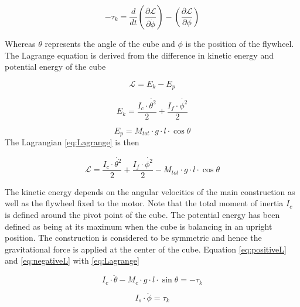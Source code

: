 \documentclass[a4paper,11pt]{kth-mag}
\begin{document}
\begin{equation} \label{eq:negativeL}
-\tau_k=\frac{d}{dt}\left(\frac{\partial \mathcal{L}}{\partial \dot{\phi}}\right)-\left(\frac{\partial \mathcal{L}}{\partial \phi}\right)
\end{equation}

Whereas $\theta$ represents the angle of the cube and $\phi$ is the position of the flywheel. \\
The Lagrange equation is derived from the difference in kinetic energy and potential energy of the cube

\begin{equation} \label{eq:Lagrange}
\mathcal{L} = E_k - E_p
\end{equation}

\begin{equation} \label{eq:kinetic energy}
E_k = \frac{I_c \cdot \dot{\theta^2}}{2} + \frac{I_f \cdot \dot{\phi^2} }{2}
\end{equation}

\begin{equation} \label{eq:potential energy}
E_p = M_{tot} \cdot g \cdot l \cdot \cos \theta
\end{equation}
The Lagrangian \eqref{eq:Lagrange} is then

\begin{equation}
\mathcal{L} = \frac{I_c \cdot \dot{\theta^2}}{2} + \frac{I_f \cdot \dot{\phi^2} }{2} - M_{tot} \cdot g \cdot l \cdot \cos \theta 
\end{equation}

The kinetic energy depends on the angular velocities of the main construction as well as the flywheel fixed to the motor. Note that the total moment of inertia $I_c$ is defined around the pivot point of the cube. The potential energy has been defined as being at its maximum when the cube is balancing in an upright position. The construction is considered to be symmetric and hence the gravitational force is applied at the center of the cube.
Equation \eqref{eq:positiveL} and \eqref{eq:negativeL} with \eqref{eq:Lagrange}

\begin{equation} \label{eq:negativeL2}
I_c \cdot \ddot{\theta} - M_c \cdot g \cdot l \cdot \sin \theta   = -\tau_k
\end{equation}

\begin{equation} \label{eq:postiveL2}
I_s \cdot \ddot{\phi} = \tau_k
\end{equation}
\end{document}
